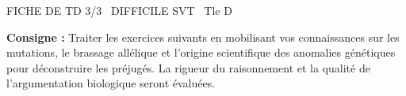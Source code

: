 \documentclass[11pt]{article}
\begin{document}
\begin{tcolorbox}[enhanced,colback=popink,colframe=popink,arc=10pt,boxrule=0pt,left=12pt,right=12pt,top=9pt,bottom=9pt]
{\color{white}\popxbold\small FICHE DE TD 3/3 \textbullet\ DIFFICILE \hfill SVT \textbullet\ Tle D\par}
\end{tcolorbox}
\vspace{4pt}
\noindent \textbf{Consigne :} Traiter les exercices suivants en mobilisant vos connaissances sur les mutations, le brassage allélique et l'origine scientifique des anomalies génétiques pour déconstruire les préjugés. La rigueur du raisonnement et la qualité de l'argumentation biologique seront évaluées.
\end{document}
